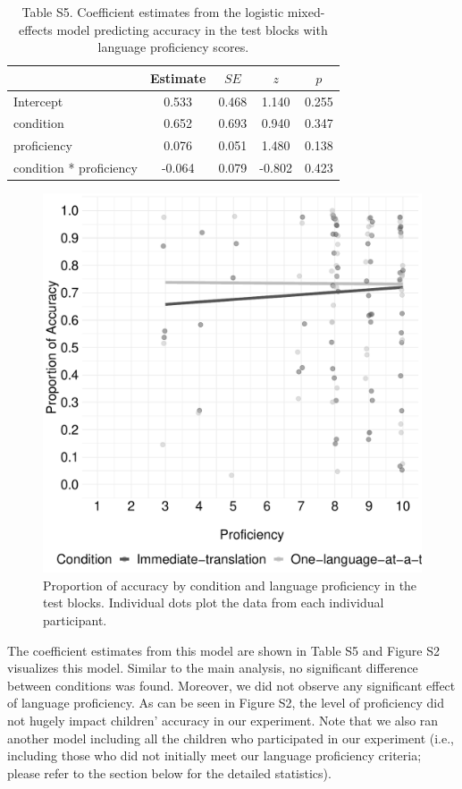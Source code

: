 \documentclass[
  man,floatsintext]{apa7}
\begin{document}
\begin{table}[H]

\begin{center}
\begin{threeparttable}

\caption{\label{tab:unnamed-chunk-16}Table S5. Coefficient estimates from the logistic mixed-effects model predicting accuracy in the test blocks with language proficiency scores.}

\begin{tabular}{m{6cm}cccc}
\toprule
 & Estimate & $SE$ & $z$ & $p$\\
\midrule
Intercept & 0.533 & 0.468 & 1.140 & 0.255\\
condition & 0.652 & 0.693 & 0.940 & 0.347\\
proficiency & 0.076 & 0.051 & 1.480 & 0.138\\
condition * proficiency & -0.064 & 0.079 & -0.802 & 0.423\\
\bottomrule
\end{tabular}

\end{threeparttable}
\end{center}

\end{table}

\begin{figure}

{\centering \includegraphics[width=0.5\linewidth]{TabletSwitch_supplemental_files/figure-latex/FigureS2-1} 

}

\caption{Proportion of accuracy by condition and language proficiency in the test blocks. Individual dots plot the data from each individual participant.}\label{fig:FigureS2}
\end{figure}

\noindent The coefficient estimates from this model are shown in Table S5 and Figure S2 visualizes this model. Similar to the main analysis, no significant difference between conditions was found. Moreover, we did not observe any significant effect of language proficiency. As can be seen in Figure S2, the level of proficiency did not hugely impact children' accuracy in our experiment. Note that we also ran another model including all the children who participated in our experiment (i.e., including those who did not initially meet our language proficiency criteria; please refer to the section below for the detailed statistics).
\end{document}
